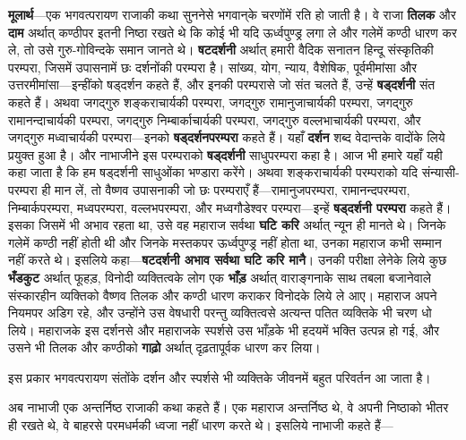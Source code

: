 \begin{sloppypar}\justifying{}
\textbf{मूलार्थ}—एक भगवत्परायण राजाकी कथा सुननेसे भगवान्‌के चरणोंमें रति हो जाती है। वे राजा \textbf{तिलक} और \textbf{दाम} अर्थात् कण्ठीपर इतनी निष्ठा रखते थे कि कोई भी यदि ऊर्ध्वपुण्ड्र लगा ले और गलेमें कण्ठी धारण कर ले, तो उसे गुरु-गोविन्दके समान जानते थे। \textbf{षटदर्शनी} अर्थात् हमारी वैदिक सनातन हिन्दू संस्कृतिकी परम्परा, जिसमें उपासनामें छः दर्शनोंकी परम्परा है। सांख्य, योग, न्याय, वैशेषिक, पूर्वमीमांसा और उत्तरमीमांसा—इन्हींको षड्दर्शन कहते हैं, और इनकी परम्परासे जो संत चलते हैं, उन्हें \textbf{षड्दर्शनी} संत कहते हैं। अथवा जगद्गुरु शङ्कराचार्यकी परम्परा, जगद्गुरु रामानुजाचार्यकी परम्परा, जगद्गुरु रामानन्दाचार्यकी परम्परा, जगद्गुरु निम्बार्काचार्यकी परम्परा, जगद्गुरु वल्लभाचार्यकी परम्परा, और जगद्गुरु मध्वाचार्यकी परम्परा—इनको \textbf{षड्दर्शन\-परम्परा} कहते हैं। यहाँ \textbf{दर्शन} शब्द वेदान्तके वादोंके लिये प्रयुक्त हुआ है। और नाभाजीने इस परम्पराको \textbf{षड्दर्शनी} साधु\-परम्परा कहा है। आज भी हमारे यहाँ यही कहा जाता है कि हम षड्दर्शनी साधुओंका भण्डारा करेंगे। अथवा शङ्कराचार्यकी परम्पराको यदि संन्यासी-परम्परा ही मान लें, तो वैष्णव उपासनाकी जो छः परम्पराएँ हैं—रामानुज\-परम्परा, रामानन्द\-परम्परा, निम्बार्क\-परम्परा, मध्व\-परम्परा, वल्लभ\-परम्परा, और मध्व\-गौडेश्वर परम्परा—इन्हें \textbf{षड्दर्शनी परम्परा} कहते हैं। इसका जिसमें भी अभाव रहता था, उसे वह महाराज सर्वथा \textbf{घटि करि} अर्थात् न्यून ही मानते थे। जिनके गलेमें कण्ठी नहीं होती थी और जिनके मस्तकपर ऊर्ध्वपुण्ड्र नहीं होता था, उनका महाराज कभी सम्मान नहीं करते थे। इसलिये कहा—\textbf{षटदर्शनी अभाव सर्वथा घटि करि मानै}। उनकी परीक्षा लेनेके लिये कुछ \textbf{भँडकुट} अर्थात् फूहड़, विनोदी व्यक्तित्वके लोग एक \textbf{भाँड़} अर्थात् वाराङ्गनाके साथ तबला बजानेवाले संस्कारहीन व्यक्तिको वैष्णव तिलक और कण्ठी धारण कराकर विनोदके लिये ले आए। महाराज अपने नियमपर अडिग रहे, और उन्होंने उस वेषधारी परन्तु व्यक्तित्वसे अत्यन्त पतित व्यक्तिके भी चरण धो लिये। महाराजके इस दर्शनसे और महाराजके स्पर्शसे उस भाँड़के भी हदयमें भक्ति उत्पन्न हो गई, और उसने भी तिलक और कण्ठीको \textbf{गाढ़ो} अर्थात् दृढ़तापूर्वक धारण कर लिया।
\end{sloppypar}
\begin{sloppypar}\justifying{}
इस प्रकार भगवत्परायण संतोंके दर्शन और स्पर्शसे भी व्यक्तिके जीवनमें बहुत परिवर्तन आ जाता है।
\end{sloppypar}
\begin{sloppypar}\justifying{}
अब नाभाजी एक अन्तर्निष्ठ राजाकी कथा कहते हैं। एक महाराज अन्तर्निष्ठ थे, वे अपनी निष्ठाको भीतर ही रखते थे, वे बाहरसे परमधर्मकी ध्वजा नहीं धारण करते थे। इसलिये नाभाजी कहते हैं—
\end{sloppypar}

